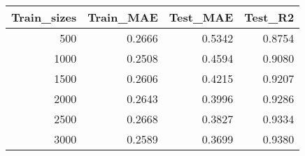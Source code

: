 \begin{tabular}{rrrr}
\toprule
Train_sizes & Train_MAE & Test_MAE & Test_R2 \\
\midrule
500 & 0.2666 & 0.5342 & 0.8754 \\
1000 & 0.2508 & 0.4594 & 0.9080 \\
1500 & 0.2606 & 0.4215 & 0.9207 \\
2000 & 0.2643 & 0.3996 & 0.9286 \\
2500 & 0.2668 & 0.3827 & 0.9334 \\
3000 & 0.2589 & 0.3699 & 0.9380 \\
\bottomrule
\end{tabular}
